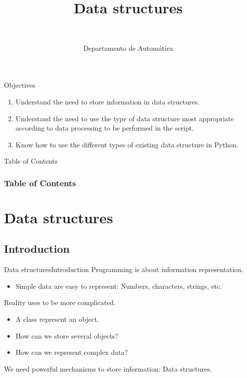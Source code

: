 \documentclass[10pt,compress]{beamer} %
\title[Data structures]{Data structures}
\author{\asignatura\\\carrera}
\institute{}
\date{Departamento de Automática}
\begin{document}
{\titlepageBlue
    \begin{frame}
        \titlepage
    \end{frame}
}

\institute{\asignatura}

\begin{frame}[plain]{}
	\begin{block}{Objectives}
		\begin{enumerate}
		\item Understand the need to store information in data structures.
		\item Understand the need to use the type of data structure most appropriate according to data processing to be performed in the script.
		\item Know how to use the different types of existing data structure in Python.
		\end{enumerate}
	\end{block}
\end{frame}

{
\begin{frame}[shrink]{Table of Contents}
 \frametitle{Table of Contents}
 \tableofcontents
\end{frame}
}

\section{Data structures}
\subsection{Introduction}
\begin{frame}{Data structures}{Introduction}
	Programming is about information representation.
	\begin{itemize}
		\item Simple data are easy to represent: Numbers, characters, strings, etc.
	\end{itemize}
	Reality uses to be more complicated.
	\begin{itemize}
		\item A class represent an object.
		\item How can we store several objects?
		\item How can we represent complex data?
	\end{itemize}
	We need powerful mechanisms to store information: Data structures.
\end{frame}
\end{document}
